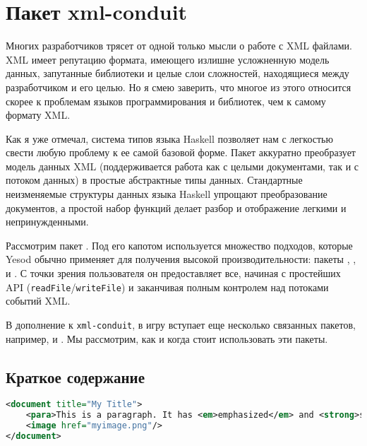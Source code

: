 \chapter{Пакет xml-conduit}

Многих разработчиков трясет от одной только мысли о работе с XML файлами. XML имеет репутацию формата, имеющего излишне усложненную модель данных, запутанные библиотеки и целые слои сложностей, находящиеся между разработчиком и его целью. Но я смею заверить, что многое из этого относится скорее к проблемам языков программирования и библиотек, чем к самому формату XML.

Как я уже отмечал, система типов языка Haskell позволяет нам с легкостью свести любую проблему к ее самой базовой форме. Пакет  аккуратно преобразует модель данных XML (поддерживается работа как с целыми документами, так и с потоком данных) в простые абстрактные типы данных. Стандартные неизменяемые структуры данных языка Haskell упрощают преобразование документов, а простой набор функций делает разбор и отображение легкими и непринужденными. %

Рассмотрим пакет . Под его капотом используется множество подходов, которые Yesod обычно применяет для получения высокой производительности: пакеты , ,  и . С точки зрения пользователя он предоставляет все, начиная с простейших API (\lstinline!readFile!/\lstinline!writeFile!) и заканчивая полным контролем над потоками событий XML.

В дополнение к \lstinline!xml-conduit!, в игру вступает еще несколько связанных пакетов, например,  и . Мы рассмотрим, как и когда стоит использовать эти пакеты.

\section{Краткое содержание} %
\begin{lstlisting}[language=XML, caption={Входной XML файл}]
<document title="My Title">
    <para>This is a paragraph. It has <em>emphasized</em> and <strong>strong</strong> words.</para>
    <image href="myimage.png"/>
</document>
\end{lstlisting}

